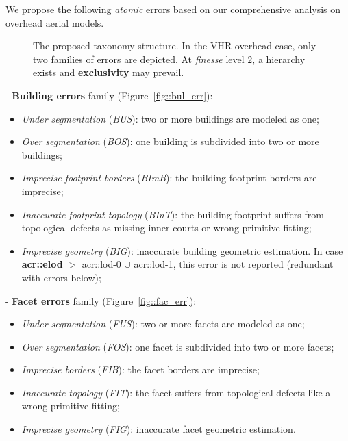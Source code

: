 \documentclass[conference]{IEEEtran}
\begin{document}
    We propose the following \textit{atomic} errors based on our comprehensive analysis on overhead aerial models.\\
	\begin{figure}
        \begin{center}
            
            \vspace{-1.1cm}
            \caption{\label{fig::taxonomy} The proposed taxonomy structure. In the VHR overhead case, only two families of errors are depicted. At \textit{finesse} level $2$, a hierarchy exists and \textbf{exclusivity} may prevail.}
        \end{center}
    \end{figure}
- \textbf{Building errors} family (Figure~\ref{fig::bul_err}):
        \begin{itemize}
        	\item \textit{Under segmentation} (\textit{BUS}): two or more buildings are modeled as one;
            \item \textit{Over segmentation} (\textit{BOS}): one building is subdivided into two or more buildings;
            \item \textit{Imprecise footprint borders} (\textit{BImB}): the building footprint borders are imprecise;
            \item \textit{Inaccurate footprint topology} (\textit{BInT}): the building footprint suffers from topological defects as missing inner courts or wrong primitive fitting;
            \item \textit{Imprecise geometry} (\textit{BIG}): inaccurate building geometric estimation. In case \textbf{\acrshort{acr::elod}} $>$ \acrshort{acr::lod}-0 $\cup$ \acrshort{acr::lod}-1, this error is not reported (redundant with errors below);
        \end{itemize}
- \textbf{Facet errors} family (Figure~\ref{fig::fac_err}):
        \begin{itemize}
        	\item \textit{Under segmentation} (\textit{FUS}): two or more facets are modeled as one;
            \item \textit{Over segmentation} (\textit{FOS}): one facet is subdivided into two or more facets;
            \item \textit{Imprecise borders} (\textit{FIB}): the facet borders are imprecise;
            \item \textit{Inaccurate topology} (\textit{FIT}): the facet suffers from topological defects like a wrong primitive fitting;
            \item \textit{Imprecise geometry} (\textit{FIG}): inaccurate facet geometric estimation.
        \end{itemize}
\end{document}
